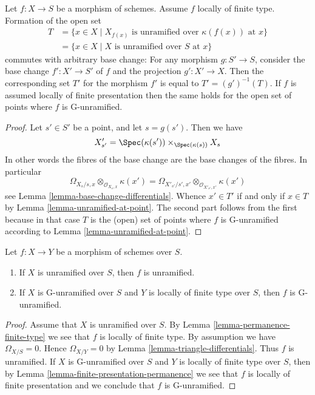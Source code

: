 \begin{lemma}
\label{lemma-set-points-where-fibres-unramified}
Let $f : X \to S$ be a morphism of schemes.
Assume $f$ locally of finite type. Formation of the open set
\begin{align*}
T
& =
\{x \in X \mid X_{f(x)}\text{ is unramified over }\kappa(f(x))\text{ at }x\} \\
& =
\{x \in X \mid X\text{ is unramified over }S\text{ at }x\}
\end{align*}
commutes with arbitrary base change:
For any morphism $g : S' \to S$, consider
the base change $f' : X' \to S'$ of $f$ and the
projection $g' : X' \to X$. Then the corresponding
set $T'$ for the morphism $f'$ is equal to $T' = (g')^{-1}(T)$.
If $f$ is assumed locally of finite presentation then the same holds
for the open set of points where $f$ is G-unramified.
\end{lemma}

\begin{proof}
Let $s' \in S'$ be a point, and let $s = g(s')$. Then we have
$$
X'_{s'} =
\Spec(\kappa(s')) \times_{\Spec(\kappa(s))} X_s
$$
In other words the fibres of the base change are the base changes
of the fibres. In particular
$$
\Omega_{X_s/s, x} \otimes_{\mathcal{O}_{X_s, x}} \kappa(x')
=
\Omega_{X'_{s'}/s', x'} \otimes_{\mathcal{O}_{X'_{s'}, x'}} \kappa(x')
$$
see
Lemma \ref{lemma-base-change-differentials}.
Whence $x' \in T'$ if and only if $x \in T$ by
Lemma \ref{lemma-unramified-at-point}.
The second part follows from the first because in that case
$T$ is the (open) set of points where $f$ is G-unramified according to
Lemma \ref{lemma-unramified-at-point}.
\end{proof}

\begin{lemma}
\label{lemma-unramified-permanence}
Let $f : X \to Y$ be a morphism of schemes over $S$.
\begin{enumerate}
\item If $X$ is unramified over $S$, then $f$ is unramified.
\item If $X$ is G-unramified over $S$ and $Y$ is locally of finite type
over $S$, then $f$ is G-unramified.
\end{enumerate}
\end{lemma}

\begin{proof}
Assume that $X$ is unramified over $S$.
By Lemma \ref{lemma-permanence-finite-type} we see that $f$
is locally of finite type.
By assumption we have $\Omega_{X/S} = 0$. Hence
$\Omega_{X/Y} = 0$ by Lemma \ref{lemma-triangle-differentials}. Thus
$f$ is unramified. If $X$ is G-unramified over $S$ and $Y$ is locally of
finite type over $S$, then by
Lemma \ref{lemma-finite-presentation-permanence}
we see that $f$ is locally of finite presentation and we conclude
that $f$ is G-unramified.
\end{proof}

